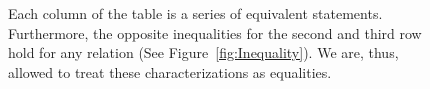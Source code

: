\documentclass[manyauthors]{fundam}
\begin{document}
\begin{figure}[htb]
    \centering
    \caption{Each column of the table is a series of equivalent statements.
      Furthermore, the opposite inequalities for the second and third row hold for any relation (See Figure~\ref{fig:Inequality}).
      We are, thus, allowed to treat these characterizations as equalities.
    }
    \label{fig:typerelations}
\end{figure}

\FloatBarrier



\end{document}
